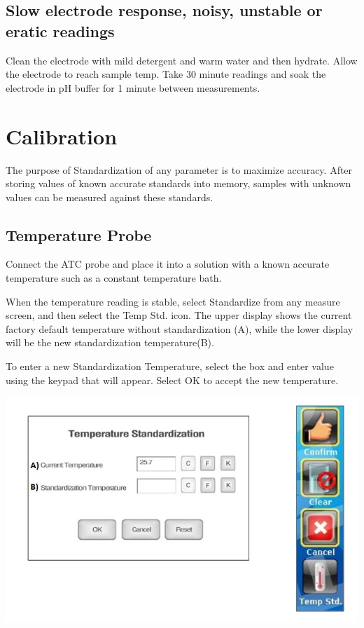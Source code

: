 \documentclass[12pt]{../SOP3}\usepackage[]{graphicx}\usepackage[]{color}
\begin{document}
\subsection{Slow electrode response, noisy, unstable or eratic readings}

\NP Clean the electrode with mild detergent and warm water and then hydrate. Allow the electrode to reach sample temp. Take 30 minute readings and soak the electrode in pH buffer for 1 minute between measurements.

\section{Calibration}
\NP The purpose of Standardization of any parameter is to maximize accuracy. After storing values of
known accurate standards into memory, samples with unknown values can be measured against
these standards.


\subsection{Temperature Probe}

\NP Connect the ATC probe and place it into a solution with a known accurate temperature such as a constant temperature bath.

\NP When the temperature reading is stable, select Standardize from any measure screen, and then select the Temp Std. icon. The upper display shows the current factory default temperature without standardization (A), while the lower display will be the new standardization temperature(B).

\NP To enter a new Standardization Temperature, select the box and enter value using the keypad that will appear. Select OK to accept the new temperature.

\includegraphics{Tempstandard.jpg}
\end{document}
